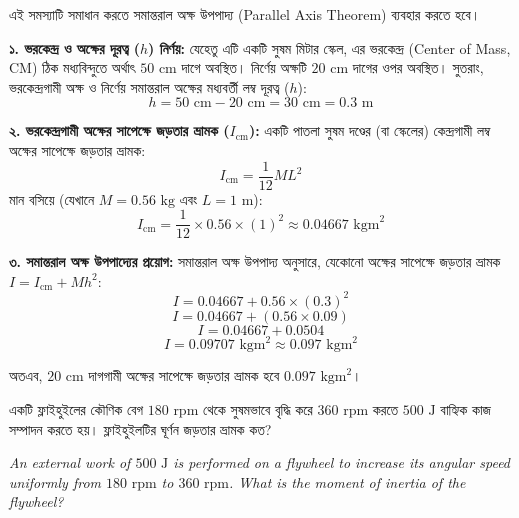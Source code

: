 \documentclass[12pt, a4paper]{article}
\begin{document}
{%
\begin{tcolorbox}[solutionbox={সমাধান (Solution)}]
\noindent
এই সমস্যাটি সমাধান করতে সমান্তরাল অক্ষ উপপাদ্য (Parallel Axis Theorem) ব্যবহার করতে হবে।

\vspace{0.5em}
\textbf{১. ভরকেন্দ্র ও অক্ষের দূরত্ব ($h$) নির্ণয়:}
যেহেতু এটি একটি সুষম মিটার স্কেল, এর ভরকেন্দ্র (Center of Mass, CM) ঠিক মধ্যবিন্দুতে অর্থাৎ $50\text{ cm}$ দাগে অবস্থিত। 
নির্ণেয় অক্ষটি $20\text{ cm}$ দাগের ওপর অবস্থিত। সুতরাং, ভরকেন্দ্রগামী অক্ষ ও নির্ণেয় সমান্তরাল অক্ষের মধ্যবর্তী লম্ব দূরত্ব ($h$):
$$h = 50\text{ cm} - 20\text{ cm} = 30\text{ cm} = 0.3\text{ m}$$

\vspace{0.5em}
\textbf{২. ভরকেন্দ্রগামী অক্ষের সাপেক্ষে জড়তার ভ্রামক ($I_{\text{cm}}$):}
একটি পাতলা সুষম দণ্ডের (বা স্কেলের) কেন্দ্রগামী লম্ব অক্ষের সাপেক্ষে জড়তার ভ্রামক:
$$I_{\text{cm}} = \frac{1}{12} M L^2$$
মান বসিয়ে (যেখানে $M = 0.56\text{ kg}$ এবং $L = 1\text{ m}$):
$$I_{\text{cm}} = \frac{1}{12} \times 0.56 \times (1)^2 \approx 0.04667\text{ kgm}^2$$

\vspace{0.5em}
\textbf{৩. সমান্তরাল অক্ষ উপপাদ্যের প্রয়োগ:}
সমান্তরাল অক্ষ উপপাদ্য অনুসারে, যেকোনো অক্ষের সাপেক্ষে জড়তার ভ্রামক $I = I_{\text{cm}} + M h^2$:
$$I = 0.04667 + 0.56 \times (0.3)^2$$
$$I = 0.04667 + (0.56 \times 0.09)$$
$$I = 0.04667 + 0.0504$$
$$I = 0.09707\text{ kgm}^2 \approx 0.097\text{ kgm}^2$$

অতএব, $20\text{ cm}$ দাগগামী অক্ষের সাপেক্ষে জড়তার ভ্রামক হবে $0.097\text{ kgm}^2$।
\end{tcolorbox}
\vspace{1em}
\begin{tcolorbox}[questionbox={প্রশ্ন (Question) 27}]
\noindent
একটি ফ্লাইহুইলের কৌণিক বেগ $180\text{ rpm}$ থেকে সুষমভাবে বৃদ্ধি করে $360\text{ rpm}$ করতে $500\text{ J}$ বাহ্যিক কাজ সম্পাদন করতে হয়। ফ্লাইহুইলটির ঘূর্ণন জড়তার ভ্রামক কত?

\vspace{0.8em}
\begin{english}
\noindent\textit{\color{darkgray}
An external work of $500\text{ J}$ is performed on a flywheel to increase its angular speed uniformly from $180\text{ rpm}$ to $360\text{ rpm}$. What is the moment of inertia of the flywheel?
}
\end{english}
\end{tcolorbox}

}
\end{document}
